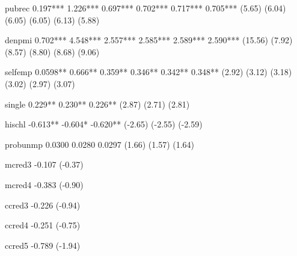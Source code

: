 \documentclass{scrartcl}
\begin{document}
\begin{STinyoutputC}
pubrec              0.197***        1.226***        0.697***        0.702***        0.717***        0.705***
                   (5.65)          (6.04)          (6.05)          (6.05)          (6.13)          (5.88)

denpmi              0.702***        4.548***        2.557***        2.585***        2.589***        2.590***
                  (15.56)          (7.92)          (8.57)          (8.80)          (8.68)          (9.06)

selfemp            0.0598**         0.666**         0.359**         0.346**         0.342**         0.348**
                   (2.92)          (3.12)          (3.18)          (3.02)          (2.97)          (3.07)

single                                                              0.229**         0.230**         0.226**
                                                                   (2.87)          (2.71)          (2.81)

hischl                                                             -0.613**        -0.604*         -0.620**
                                                                  (-2.65)         (-2.55)         (-2.59)

probunmp                                                           0.0300          0.0280          0.0297
                                                                   (1.66)          (1.57)          (1.64)

mcred3                                                                             -0.107
                                                                                  (-0.37)

mcred4                                                                             -0.383
                                                                                  (-0.90)

ccred3                                                                             -0.226
                                                                                  (-0.94)

ccred4                                                                             -0.251
                                                                                  (-0.75)

ccred5                                                                             -0.789
                                                                                  (-1.94)


\end{STinyoutputC}
\end{document}
